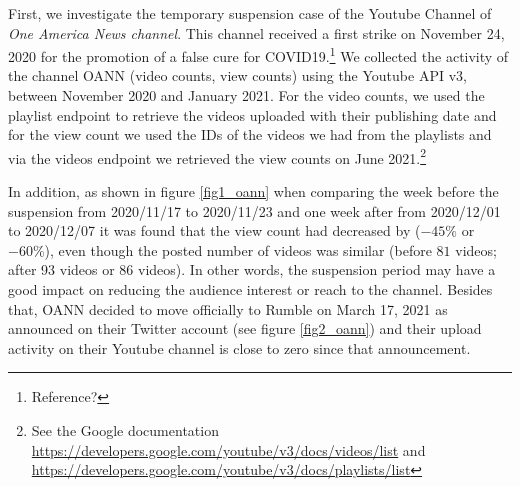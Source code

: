 \documentclass[11pt,a4paper]{article}
\begin{document}
First, we investigate the temporary suspension case of the Youtube Channel of {\it One America News channel}. This channel received a first strike on November 24, 2020 for the promotion of  a false cure for COVID19.\footnote{Reference?} We collected the activity of the channel OANN (video counts, view counts) using  the Youtube API v3, between November 2020 and January 2021. For the video counts, we used the playlist endpoint to retrieve the videos uploaded with their publishing date and for the view count we used the IDs of the videos we had from the playlists and via the videos endpoint we retrieved the view counts on June 2021.\footnote{See the Google documentation  \href{https://developers.google.com/youtube/v3/docs/videos/list}{https://developers.google.com/youtube/v3/docs/videos/list} and \href{https://developers.google.com/youtube/v3/docs/playlists/list}{https://developers.google.com/youtube/v3/docs/playlists/list}} 

\smallskip



In addition, as shown in figure \ref{fig1_oann} when comparing the week before the suspension from 2020/11/17 to 2020/11/23 and one week after from 2020/12/01 to 2020/12/07 it was found that the view count had decreased by ($-45\%$ or $-60\%$), even though the posted number of videos was similar (before $81$ videos; after 93 videos or 86 videos). In other words, the suspension period may have a good impact on reducing the audience interest or reach to the channel. Besides that, OANN decided to move officially to Rumble on March 17, 2021 as announced on their Twitter account (see figure \ref{fig2_oann}) and their upload activity on their Youtube channel is close to zero since that announcement. 

\end{document}
